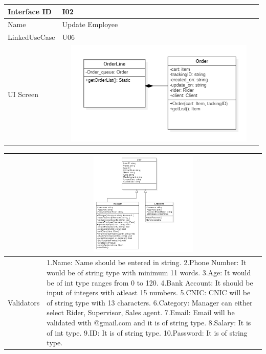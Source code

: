 \documentclass[12pt]{article}
\begin{document}
\begin{table}[H] 
\begin{tabular} {|m{6em}|m{12cm}|}
\hline
Interface ID & I02 \\ \hline
\newline
Name & Update Employee \\ \hline
LinkedUseCase & U06 \\ \hline
UI Screen &\newline \includegraphics [width=10cm, height=5cm] {2.png} \\ \hline
\end{tabular}
\end{table}
\begin{table}[H] 
\begin{tabular} {|m{6em}|m{12cm}|}
\hline
     & \newline\newline\includegraphics [width=10cm, height=5cm] {3.png}
     \\ \hline
\newline
Validators &  1.Name: Name should be entered in string.
\newline
2.Phone Number: It would be of string type with minimum 11 words.
\newline
3.Age: It would be of int type ranges from 0 to 120.
\newline
4.Bank Account: It should be input of integers with atleast 15 numbers.
\newline
5.CNIC: CNIC will be of string type with 13 characters.
\newline
6.Category: Manager can either select Rider, Supervisor, Sales agent.
\newline
7.Email: Email will be validated with @gmail.com and it is of string type.
\newline
8.Salary: It is of int type.
\newline
9.ID: It is of string type.
\newline
10.Password: It is of string type.
\newline
\\ \hline
\end{tabular}
\end{table}
\end{document}
